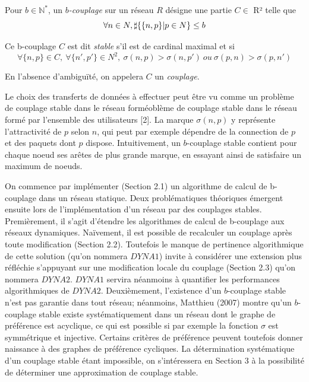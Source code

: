 \documentclass[12pt,a4paper]{article}
\begin{document}
\vspace{0.2cm}


Pour $b\in \mathbb{N}^*$, un \textit{$b$-couplage} sur un réseau $R$ désigne une partie $C\in$ R² telle que 
\begin{equation}
\forall n\in N, \space \sharp\{\{n, p\}\space  | \space p \in N\} \space \leq \space b
\end{equation}


Ce b-couplage $C$ est dit \textit{stable} s'il est de cardinal maximal et si 
\begin{equation}
\forall \{n, p\}\in C, \ \forall \{n', p'\} \in N^{2},\  \sigma(n, p) > \sigma(n, p') \ ou \ \sigma(p, n) > \sigma(p, n')
\end{equation}


En l'absence d'ambiguïté, on appelera $C$ un \textit{couplage}. 


Le choix des transferts de données à effectuer peut être vu comme un problème de couplage stable dans le réseau forméoblème de couplage stable dans le réseau formé par l'ensemble des utilisateurs [2]. La marque $\sigma(n, p)$ y représente l'attractivité de $p$ selon $n$, qui peut par exemple dépendre de la connection de $p$ et des paquets dont $p$ dispose. Intuitivement, un $b$-couplage stable contient pour chaque noeud ses arêtes de plus grande marque, en essayant ainsi de satisfaire un maximum de noeuds. 


On commence par implémenter (Section 2.1) un algorithme de calcul de b-couplage dans un réseau statique. 
Deux problématiques théoriques émergent ensuite lors de l'implémentation d'un réseau par des couplages stables. 
Premièrement, il s'agit d'étendre les algorithmes de calcul de b-couplage aux réseaux dynamiques. 
Naïvement, il est possible de recalculer un couplage après toute modification (Section 2.2).
Toutefois le manque de pertinence algorithmique de cette solution (qu'on nommera $DYNA1$) invite à considérer une extension plus réfléchie s'appuyant sur une modification locale du couplage (Section 2.3) qu'on nommera $DYNA2$. 
$DYNA1$ servira néanmoins à quantifier les performances algorithmiques de $DYNA2$. 
Deuxièmement, l'existence d'un $b$-couplage stable n'est pas garantie dans tout réseau; néanmoins, Matthieu (2007) montre qu'un $b$-couplage stable existe systématiquement dans un réseau dont le graphe de préférence est acyclique, ce qui est possible si par exemple la fonction $\sigma$ est symmétrique et injective. 
Certains critères de préférence peuvent toutefois donner naissance à des graphes de préférence cycliques.
La détermination systématique d'un couplage stable étant impossible, on s'intéressera en Section 3 à la possibilité de déterminer une approximation de couplage stable.
\end{document}
